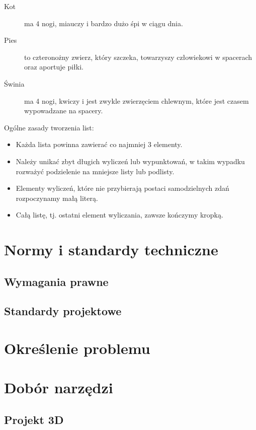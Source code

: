 \begin{description}
    \item[Kot] ma 4 nogi, miauczy i bardzo dużo śpi w ciągu dnia.
    \item[Pies] to czteronożny zwierz, który szczeka, towarzyszy człowiekowi w 
   spacerach oraz aportuje piłki.
    \item[Świnia] ma 4 nogi, kwiczy i jest zwykle zwierzęciem chlewnym, które jest 
   czasem wypowadzane na spacery.
\end{description}
\noindent Ogólne zasady tworzenia list:
\begin{itemize}
    \item Każda lista powinna zawierać co najmniej 3 elementy.
    \item Należy unikać zbyt długich wyliczeń lub wypunktowań, w takim wypadku rozważyć podzielenie 
    na mniejsze listy lub podlisty.
    \item Elementy wyliczeń, które nie przybierają postaci samodzielnych zdań rozpoczynamy małą literą.
    \item Całą listę, tj. ostatni element wyliczania, zawsze kończymy kropką.
\end{itemize}


\clearpage\section{Normy i standardy techniczne}
\noindent \lipsum[2]

    \subsection{Wymagania prawne}
    \noindent \lipsum[2]

    \subsection{Standardy projektowe}
    \noindent \lipsum[2]

\clearpage\section{Określenie problemu}
    \noindent \lipsum[2]

\clearpage\section{Dobór narzędzi}
    \noindent \lipsum[2]

    \subsection{Projekt 3D}
        \noindent \lipsum[2]

